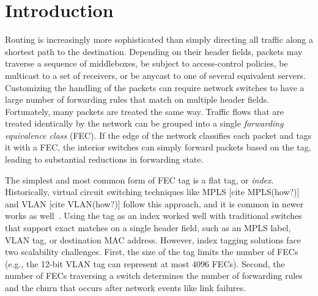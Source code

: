 \section{Introduction}
\label{sec:intro}
Routing is increasingly more sophisticated than simply directing all traffic along a shortest path to the destination.  Depending on their header fields, packets may traverse a sequence of middleboxes, be subject to access-control policies, be multicast to a set of receivers, or be anycast to one of several equivalent servers.  Customizing the handling of the packets can require network switches to have a large number of forwarding rules that match on multiple header fields.  Fortunately, many packets are treated the same way.  Traffic flows that are treated identically by the network can be grouped into a single \emph{forwarding equivalence class} (FEC). If the edge of the network classifies each packet and tags it with a FEC, the interior switches can simply forward packets based on the tag, leading to substantial reductions in forwarding state.

The simplest and most common form of FEC tag is a flat tag, or \emph{index}. Historically, virtual circuit switching techniques like MPLS [cite MPLS(how?)] and VLAN [cite VLAN(how?)] follow this approach, and it is common in newer works as well~\cite{flowtags, sdx}.  Using the tag as an index worked well with traditional switches that support exact matches on a single header field, such as an MPLS label, VLAN tag, or destination MAC address.  However, index tagging solutions face two scalability challenges.  First, the size of the tag limits the number of FECs (e.g., the 12-bit VLAN tag can represent at most 4096 FECs).  Second, the number of FECs traversing a switch determines the number of forwarding rules and the churn that occurs after network events like link failures.

